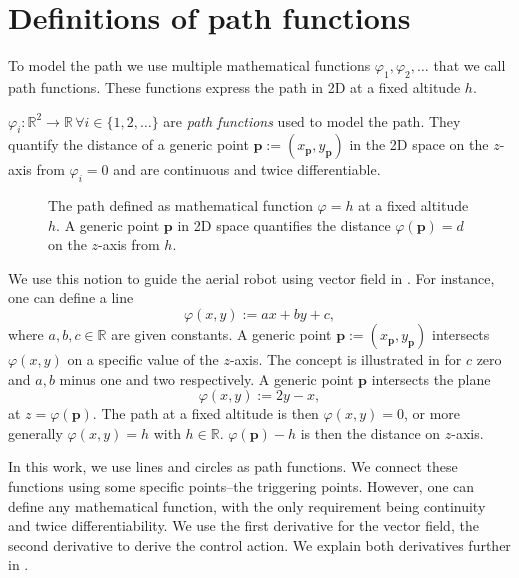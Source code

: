 \section{Definitions of path functions}
\label{sec:path-functions}

To model the path we use multiple mathematical functions $\varphi_1,\varphi_2,\dots$ that we call path functions. These functions express the path in 2D at a fixed altitude $h$. 

\begin{highlight}
  \begin{defn}\label{def:paths}
    $\varphi_i:\mathbb{R}^2\rightarrow\mathbb{R}\,\forall i\in\{1,2,\dots\}$ are \emph{path functions} used to model the path. They quantify the distance of a generic point $\mathbf{p}:=(x_{\mathbf{p}},y_{\mathbf{p}})$ in the 2D space on the $z$-axis from $\varphi_i=0$ and are continuous and twice differentiable. 
  \end{defn}
\end{highlight}

\begin{figure}[t]
  \centering
  
  \caption[Concept of the path and generic point in space]{The path defined as mathematical function $\varphi=h$ at a fixed altitude $h$. A generic point $\mathbf{p}$ in 2D space quantifies the distance $\varphi(\mathbf{p})=d$ on the $z$-axis from $h$.}
  \label{fig:plot1}
\end{figure}

We use this notion to guide the aerial robot using vector field in . For instance, one can define a line
\begin{equation}\label{eq:basic-path}
  \varphi(x,y):=ax+by+c,
\end{equation}
where $a,b,c\in\mathbb{R}$ are given constants. A generic point $\mathbf{p}:=(x_{\mathbf{p}},y_{\mathbf{p}})$ intersects $\varphi(x,y)$ on a specific value of the $z$-axis. The concept is illustrated in  for $c$ zero and $a,b$ minus one and two respectively. A generic point $\mathbf{p}$ intersects the plane
\begin{equation}
  \varphi(x,y):=2y-x,
\end{equation}
at $z=\varphi(\mathbf{p})$. The path at a fixed altitude is then $\varphi(x,y)=0$, or more generally $\varphi(x,y)=h$ with $h\in\mathbb{R}$. $\varphi(\mathbf{p})-h$ is then the distance on $z$-axis.

In this work, we use lines and circles as path functions. We connect these functions using some specific points--the triggering points. However, one can define any mathematical function, with the only requirement being continuity and twice differentiability. We use the first derivative for the vector field, the second derivative to derive the control action. We explain both derivatives further in .

